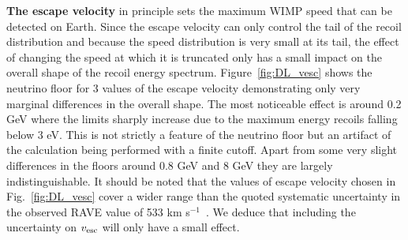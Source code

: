 {\bf The escape velocity} in principle sets the maximum WIMP speed that can be detected on Earth. Since the escape velocity can only control the tail of the recoil distribution and because the speed distribution is very small at its tail, the effect of changing the speed at which it is truncated only has a small impact on the overall shape of the recoil energy spectrum. Figure~\ref{fig:DL_vesc} shows the neutrino floor for 3 values of the escape velocity demonstrating only very marginal differences in the overall shape. The most noticeable effect is around 0.2 GeV where the limits sharply increase due to the maximum energy recoils falling below 3 eV. This is not strictly a feature of the neutrino floor but an artifact of the calculation being performed with a finite cutoff. Apart from some very slight differences in the floors around 0.8 GeV and 8 GeV they are largely indistinguishable. It should be noted that the values of escape velocity chosen in Fig.~\ref{fig:DL_vesc} cover a wider range than the quoted systematic uncertainty in the observed RAVE value of 533 km s$^{-1}$~\cite{Piffl:2013mla}. We deduce that including the uncertainty on $v_{\rm esc}$ will only have a small effect.




